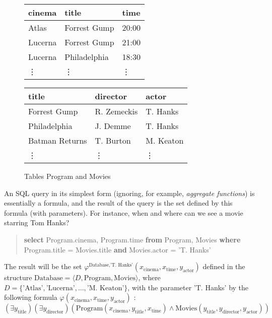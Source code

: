 \begin{figure}[htbp]
\begin{multicols}{2}
    \ttfamily\small
    \begin{tabular}{lll}
        cinema         & title          & time   \\ \hline
        Atlas          & Forrest Gump   & 20:00  \\
        Lucerna        & Forrest Gump   & 21:00  \\
        Lucerna        & Philadelphia   & 18:30  \\
        \vdots         & \vdots         & \vdots
    \end{tabular}

    \begin{tabular}{lll}
        title          & director    & actor \\ \hline
        Forrest Gump   & R. Zemeckis & T. Hanks      \\
        Philadelphia   & J. Demme    & T. Hanks      \\
        Batman Returns & T. Burton   & M. Keaton     \\
        \vdots         & \vdots      & \vdots
    \end{tabular}    
\end{multicols}
\caption{Tables Program and Movies}
\label{figure:database}
\end{figure}

An SQL query in its simplest form (ignoring, for example, \emph{aggregate functions}) is essentially a formula, and the result of the query is the set defined by this formula (with parameters). For instance, when and where can we see a movie starring Tom Hanks?

\begin{quote}
    \textbf{select} Program.cinema, Program.time \textbf{from} Program, Movies \textbf{where}\\ Program.title = Movies.title  \textbf{and} Movies.actor = 'T. Hanks'   
\end{quote}

The result will be the set $\varphi^{\text{Database},\text{'T. Hanks'}} (x_\mathrm{cinema},x_\mathrm{time},y_\mathrm{actor})$ defined in the structure $\text{Database}=\langle D, \mathrm{Program}, \mathrm{Movies}\rangle$, where $D=\{\text{'Atlas'},\text{'Lucerna'},\dots,\text{'M. Keaton'}\}$, with the parameter 'T. Hanks' by the following formula $\varphi(x_\mathrm{cinema},x_\mathrm{time},y_\mathrm{actor})$ :
$$
(\exists y_\mathrm{title})(\exists y_\mathrm{director})(\mathrm{Program}(x_\mathrm{cinema},y_\mathrm{title},x_\mathrm{time}) \land \mathrm{Movies}(y_\mathrm{title},y_\mathrm{director},y_\mathrm{actor}))
$$


